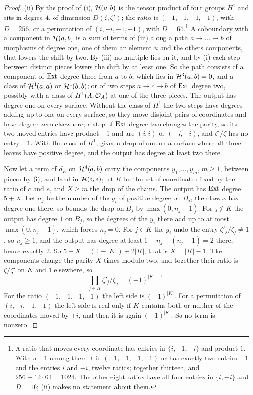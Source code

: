\begin{proof}
(ii) By the proof of (i), $\mathcal{H}(a,b)$ is the tensor
product of four groups $H^{1}$ and sits in degree $4$, of dimension
$D(\zeta,\zeta')$; the ratio is $(-1,-1,-1,-1)$, with $D=256$, or a
permutation of $(i,-i,-1,-1)$, with $D=64$.\footnote{A ratio that moves
every coordinate has entries in $\{i,-1,-i\}$ and product $1$. With a $-1$
among them it is $(-1,-1,-1,-1)$ or has exactly two entries $-1$ and the
entries $i$ and $-i$, twelve ratios; together thirteen, and
$256+12\cdot64=1024$. The other eight ratios have all four entries in
$\{i,-i\}$ and $D=16$; (ii) makes no statement about them.}\enlargethispage{3pt} A coboundary with a component in $\mathcal{H}(a,b)$ is
a sum of terms of (iii) along a path
$a\to\dots\to b$ of morphisms of degree one, one of them an element $u$ and
the others components, that lowers the shift by two. By
(iii) no multiple lies on it, and by
(i) each step between distinct pieces lowers the shift
by at least one. So the path consists of a component of $\operatorname{Ext}$ degree three
from $a$ to $b$, which lies in $\mathcal{H}^{3}(a,b)=0$, and a class of
$\mathcal{H}^{1}(a,a)$ or $\mathcal{H}^{1}(b,b)$; or of two steps $a\to c\to b$ of $\operatorname{Ext}$
degree two, possibly with a class of $H^{1}(A,\mathcal{O}_{A})$ at one of the three
pieces. The output has degree one on every surface. Without the class of
$H^{1}$ the two steps have degrees adding up to one on every surface, so they
move disjoint pairs of coordinates and have degree zero elsewhere; a step of
$\operatorname{Ext}$ degree two changes the parity, so its two moved entries have product
$-1$ and are $(i,i)$ or $(-i,-i)$, and $\zeta'/\zeta$ has no entry $-1$.
With the class of $H^{1}$,  gives a drop of one on a
surface where all three leaves have positive degree, and the output has
degree at least two there.

Now let a term of $d_{E}$ on $\mathcal{H}^{4}(a,b)$ carry the components
$y_{1},\dots,y_{m}$, $m\ge1$, between pieces by (i), and land in
$\mathcal{H}(c,e)$; let $K$ be the set of coordinates fixed by the ratio of $c$ and
$e$, and $X\ge m$ the drop of the chains. The output has $\operatorname{Ext}$ degree
$5+X$. Let $n_{j}$ be the number of the $y_{i}$ of positive degree on
$B_{j}$; the class $x$ has degree one there, so  bounds
the drop on $B_{j}$ by $\max(0,n_{j}-1)$. For $j\notin K$ the output has
degree $1$ on $B_{j}$, so the degrees of the $y_{i}$ there add up to at most
$\max(0,n_{j}-1)$, which forces $n_{j}=0$. For $j\in K$ the $y_{i}$ undo the
entry $\zeta'_{j}/\zeta_{j}\ne1$, so $n_{j}\ge1$, and the output has degree
at least $1+n_{j}-(n_{j}-1)=2$ there, hence exactly $2$. So
$5+X=(4-|K|)+2|K|$, that is $X=|K|-1$. The components change the parity
$X$ times modulo two, and together their ratio is $\zeta/\zeta'$ on $K$ and
$1$ elsewhere, so
\[
  \prod_{j\in K}\zeta'_{j}/\zeta_{j}=(-1)^{|K|-1}.
\]
For the ratio $(-1,-1,-1,-1)$ the left side is $(-1)^{|K|}$. For a
permutation of $(i,-i,-1,-1)$ the left side is real only if $K$ contains
both or neither of the coordinates moved by $\pm i$, and then it is again
$(-1)^{|K|}$. So no term is nonzero.


\end{proof}
